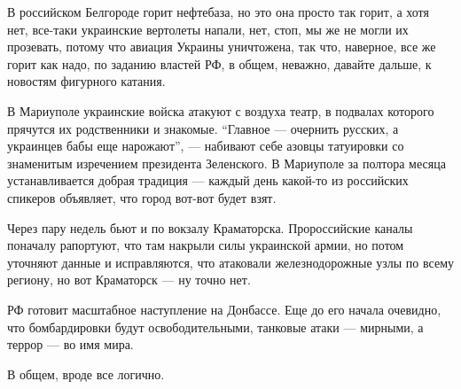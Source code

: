 В российском Белгороде горит нефтебаза, но это она просто так горит, а хотя
нет, все-таки украинские вертолеты напали, нет, стоп, мы же не могли их
прозевать, потому что авиация Украины уничтожена, так что, наверное, все же
горит как надо, по заданию властей РФ, в общем, неважно, давайте дальше, к
новостям фигурного катания.

В Мариуполе украинские войска атакуют с воздуха театр, в подвалах которого
прячутся их родственники и знакомые. \enquote{Главное — очернить русских, а украинцев
бабы еще нарожают}, — набивают себе азовцы татуировки со знаменитым изречением
президента Зеленского. В Мариуполе за полтора месяца устанавливается добрая
традиция — каждый день какой-то из российских спикеров объявляет, что город
вот-вот будет взят.

Через пару недель бьют и по вокзалу Краматорска. Пророссийские каналы поначалу
рапортуют, что там накрыли силы украинской армии, но потом уточняют данные и
исправляются, что атаковали железнодорожные узлы по всему региону, но вот
Краматорск — ну точно нет.

РФ готовит масштабное наступление на Донбассе. Еще до его начала очевидно, что
бомбардировки будут освободительными, танковые атаки — мирными, а террор — во
имя мира.

В общем, вроде все логично.
